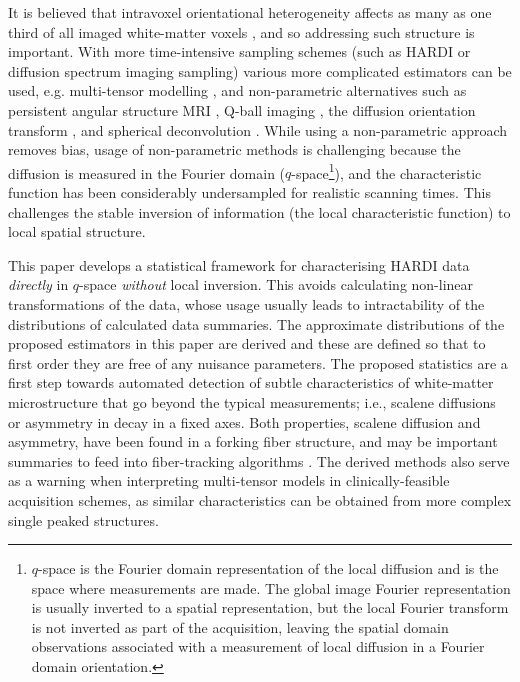 \documentclass[dvips,aoas,preprint]{imsart}
\numberwithin{equation}{section}
\theoremstyle{plain}
\begin{document}
It is believed that intravoxel
orientational heterogeneity affects as many as one third of all imaged
white-matter voxels \citep{Behrens2007}, and so addressing such structure is important.  
With more time-intensive sampling schemes (such as HARDI \citep{tuc-etal:high} or diffusion spectrum imaging sampling) various more complicated estimators can be used, e.g. multi-tensor modelling \citep{Alexander2005}, and non-parametric alternatives such as
persistent angular structure MRI \citep{Jansons}, Q-ball imaging
\citep{Tuch}, the diffusion orientation transform
\citep{Ozarslan2006}, and spherical deconvolution \citep{Tournier}.
While using a non-parametric approach removes bias, usage of non-parametric methods is challenging because the diffusion is measured in the Fourier domain ($q$-space\footnote{$q$-space is the Fourier domain representation of the local diffusion and is the space where measurements are made. The global image Fourier representation is usually inverted to a spatial representation, but the local Fourier transform is not inverted as part of the acquisition, leaving the spatial domain observations associated with a measurement of local diffusion in a Fourier domain orientation.}), and the characteristic function has been considerably undersampled for realistic scanning times. This challenges the stable inversion of information (the local characteristic function) to local spatial structure.

This paper develops a statistical framework for characterising
HARDI data {\em directly} in $q$-space
\citep{tuc-etal:high} {\em without} local inversion.
 This avoids calculating non-linear transformations of the data, whose usage usually leads to intractability of the distributions of calculated data summaries. The approximate distributions of the
proposed estimators in this paper are derived and these are defined so that to first order they are free of any
nuisance parameters.  The proposed statistics are a first step towards
automated detection of subtle characteristics of white-matter
microstructure that go beyond the typical measurements; i.e., scalene
diffusions or asymmetry in decay in a fixed axes.  Both properties,
scalene diffusion and asymmetry, have been found in a forking fiber
structure, and may be important summaries to feed into fiber-tracking
algorithms \citep{mor-zij:fiber-tracking}.  The derived methods also
serve as a warning when interpreting multi-tensor models in
clinically-feasible acquisition schemes, as similar characteristics can be obtained from more complex single peaked structures.
\end{document}
